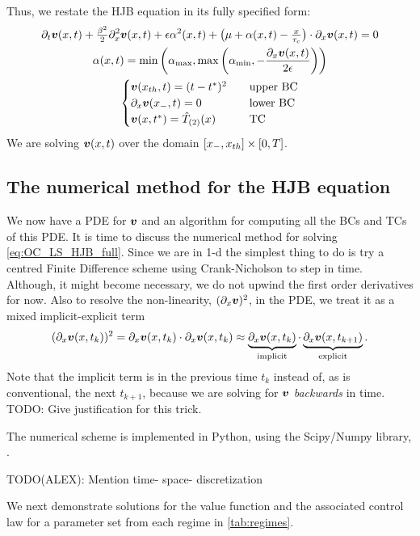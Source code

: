 \documentclass{article}
\begin{document}
Thus, we restate the HJB equation in its fully specified form:
\begin{equation}
\begin{gathered}
{\partial}_t { \boldsymbol{v} }(x,t) + \tfrac{{\beta}^2}{2} {\partial}_x^2{ \boldsymbol{v} }(x,t)+
{\epsilon} {\alpha}^2(x,t) + \big({\mu } + {\alpha}(x,t) -\tfrac{x}{{ \tau_{c} }}\big)\cdot {\partial}_x{ \boldsymbol{v} }(x,t)
= 0
\\
{\alpha} (x,t) = \min \left({ {\alpha}_{\textrm{max}} }, \max\left({ {\alpha}_{\textrm{min}} }, -\frac{{\partial}_x { \boldsymbol{v} }(x,t)}{2{\epsilon}}\right)
\right)
\\
\begin{cases}
{ \boldsymbol{v} }({ x_{th} },t) = (t-{ t^* })^2  \quad & \textrm{upper BC}
\\
{\partial}_x { \boldsymbol{v} }({ x_{-} }, t)  = 0  \quad &\textrm{lower BC}
\\
{ \boldsymbol{v} }(x,{ t^* })  =
{ \hat{T}_{(2)} }(x)
\,& \textrm{TC}
\end{cases}
\end{gathered}
\label{eq:OC_LS_HJB_full}
\end{equation}
We are solving ${ \boldsymbol{v} }(x,t)$ over the domain $[{ x_{-} }, { x_{th} }] \times [0,T]$.

\subsection{The numerical method for the HJB equation}
We now have a PDE for ${ \boldsymbol{v} }$ and an algorithm for computing all the BCs and TCs of
this PDE. It is time to discuss the numerical method for solving \cref{eq:OC_LS_HJB_full}. Since we are in 1-d the simplest thing to do is try a
centred Finite Difference scheme using Crank-Nicholson to step in time.
Although, it might become necessary, we do not upwind the first order
derivatives for now. Also to resolve the non-linearity, $({\partial}_x{ \boldsymbol{v} })^2$, in the
PDE, we treat it as a mixed implicit-explicit term
$$({\partial}_x { \boldsymbol{v} }(x,t_k))^2 = {\partial}_x
{ \boldsymbol{v} }(x,t_k) \cdot {\partial}_x { \boldsymbol{v} }(x,t_k) \approx \underbrace{{\partial}_x { \boldsymbol{v} }(x,t_k)}_{\textrm{implicit}}
\cdot \underbrace{{\partial}_x{ \boldsymbol{v} }(x,t_{k+1})}_{\textrm{explicit}}.$$ Note that the
implicit term is in the previous time $t_k$ instead of, as is conventional,
the next $t_{k+1}$, because we are solving for ${ \boldsymbol{v} }$ {\sl backwards} in time. 
TODO: Give justification for this trick.

The numerical scheme is implemented in Python, using the Scipy/Numpy library,
\cite{Scipy}. 

TODO(ALEX): Mention time- space- discretization

We next demonstrate solutions for the value function and the associated
control law for a parameter set from each regime in \cref{tab:regimes}.
\end{document}
